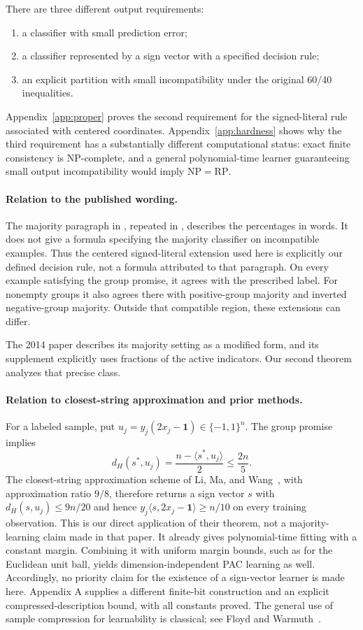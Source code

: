\documentclass[11pt,a4paper]{article}
\theoremstyle{remark}
\newcommand{\ip}[2]{\langle #1,#2\rangle}
\newcommand{\1}{\mathbf 1}
\newcommand{\RP}{\mathrm{RP}}
\newcommand{\NP}{\mathrm{NP}}
\begin{document}
There are three different output requirements:
\begin{enumerate}[itemsep=2pt]
\item a classifier with small prediction error;
\item a classifier represented by a sign vector with a specified decision rule;
\item an explicit partition with small incompatibility under the original 60/40
inequalities.
\end{enumerate}
Appendix~\ref{app:proper} proves the second requirement for the signed-literal
rule associated with centered coordinates. Appendix~\ref{app:hardness}
shows why the third requirement has a substantially different computational
status: exact finite consistency is NP-complete, and a general polynomial-time
learner guaranteeing small output incompatibility would imply $\NP=\RP$.

\paragraph{Relation to the published wording.}
The majority paragraph in \cite[Section 3.2]{bb2007}, repeated in
\cite[Section 6.2]{bb2010}, describes the percentages in words. It does not give
a formula specifying the majority classifier on incompatible examples. Thus the
centered signed-literal extension used here is explicitly our defined decision
rule, not a formula attributed to that paragraph. On every example satisfying
the group promise, it agrees with the prescribed label. For nonempty groups it
also agrees there with positive-group majority and inverted negative-group
majority. Outside that compatible region, these extensions can differ.

The 2014 paper \cite{bb2014} describes its majority setting as a modified form,
and its supplement \cite[Appendix A.2]{bb2014supp} explicitly uses fractions
of the active indicators. Our second theorem analyzes that precise class.

\paragraph{Relation to closest-string approximation and prior methods.}
For a labeled sample, put $u_j=y_j(2x_j-\1)\in\{-1,1\}^n$.
The group promise implies
\[
 d_H(s^*,u_j)=\frac{n-\ip{s^*}{u_j}}2\le\frac{2n}{5}.
\]
The closest-string approximation scheme of Li, Ma, and
Wang~\cite[Theorem 2.6]{lmw2002}, with approximation ratio $9/8$, therefore
returns a sign vector $s$ with $d_H(s,u_j)\le9n/20$ and hence
$y_j\ip{s}{2x_j-\1}\ge n/10$ on every training observation.
This is our direct application of their theorem, not a majority-learning
claim made in that paper. It already gives polynomial-time fitting with a
constant margin. Combining it with uniform margin bounds, such as
\cite[Theorem 3]{bb2014} for the Euclidean unit ball, yields dimension-independent
PAC learning as well. Accordingly, no priority claim for the existence of a
sign-vector learner is made here. Appendix A supplies a different finite-bit
construction and an explicit compressed-description bound, with all constants
proved. The general use of sample compression for learnability is classical;
see Floyd and Warmuth~\cite{fw1995}.
\end{document}

